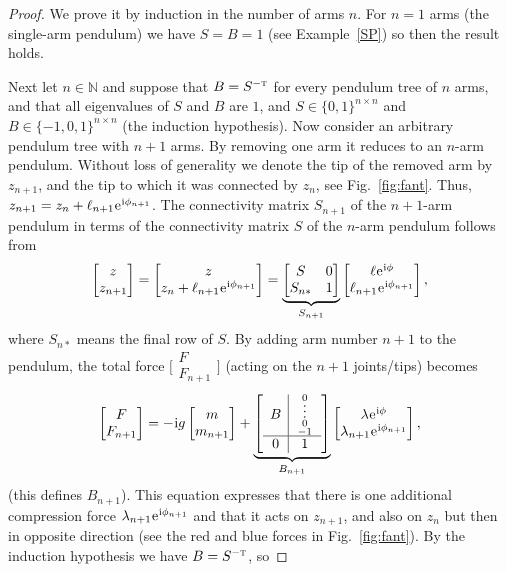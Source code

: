 \documentclass[12pt]{article}
\newcommand{\T}{\textsc{t}}
\newcommand{\mi}{\hspace{.4pt}\mathrm{i}}
\newcommand{\e}{\hspace{.4pt}\mathrm{e}}
\theoremstyle{sfdefinition}%
\theoremstyle{sfdefinition}
\newcommand{\mymatrix}[1]{\begin{bmatrix} #1 \end{bmatrix}}
\newcommand{\smat}[1]{\bigl[\begin{smallmatrix} #1 
                            \end{smallmatrix}\bigr]}
\newcommand{\ssmat}[1]{\begin{smallmatrix} #1 \end{smallmatrix}}
\begin{document}
\begin{proof}
  We prove it by induction in the number of arms $n$. For $n=1$ arms
  (the single-arm pendulum) we have $S=B=1$ (see Example~\ref{SP}) so
  then the result holds.

  Next let $n\in\mathbb{N}$ and suppose that $B=S^{-\T}$ for every
  pendulum tree of $n$ arms, and that all eigenvalues of $S$ and $B$
  are $1$, and $S\in\{0,1\}^{n\times n}$ and
  $B\in\{-1,0,1\}^{n\times n}$ (the induction hypothesis).  Now
  consider an arbitrary pendulum tree with $n+1$ arms. By removing one
  arm it reduces to an $n$-arm pendulum. Without loss of generality we
  denote the tip of the removed arm by $z_{n+1}$, and the tip to which
  it was connected by $z_n$, see Fig.~\ref{fig:fant}. Thus,
  $z_{n+1}=z_n+\ell_{n+1}\e^{\mi\phi_{n+1}}$. The connectivity matrix
  $S_{n+1}$ of the $n+1$-arm pendulum in terms of the connectivity
  matrix $S$ of the $n$-arm pendulum follows from
  \[
    \mymatrix{z\\ z_{n+1}}
    =
    \mymatrix{z\\ z_n + \ell_{n+1}\e^{\mi\phi_{n+1}}}
    = \underbrace{\mymatrix{S & 0\\ S_{n*} &
        1}}_{S_{n+1}}\mymatrix{\ell\e^{\mi\phi}\\ \ell_{n+1}\e^{\mi\phi_{n+1}}},
  \]
  where $S_{n*}$ means the final row of $S$. By adding arm number
  $n+1$ to the pendulum, the total force $\smat{F\\ F_{n+1}}$ (acting
  on the $n+1$ joints/tips) becomes
  \[
    \mymatrix{F\\ F_{n+1}}
    = -\mi g \mymatrix{m\\ m_{n+1}}
    +\underbrace{\left[\begin{array}{c|c}
                         B & \ssmat{0\\[-1ex] \vdots\\ 0\\-1}\\ \hline
                         0 & 1
                       \end{array}\right]}_{B_{n+1}}
                   \mymatrix{\lambda\e^{\mi\phi}\\
                     \lambda_{n+1}\e^{\mi\phi_{n+1}}},
  \]
  (this defines $B_{n+1}$).  This equation expresses that there is one
  additional compression force $\lambda_{n+1}\e^{\mi\phi_{n+1}}$ and
  that it acts on $z_{n+1}$, and also on $z_n$ but then in opposite direction
  (see the red and blue forces in Fig.~\ref{fig:fant}).  By the
  induction hypothesis we have $B=S^{-\T}$, so

\end{proof}
\end{document}

